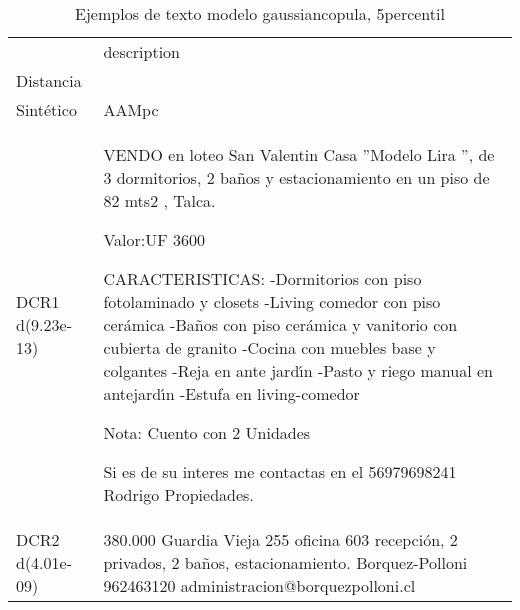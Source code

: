 \begin{table}[H]
\centering
\fontsize{10}{14}\selectfont
\caption{Ejemplos de texto modelo gaussiancopula, 5percentil}
\label{table-example-economicos-b-2-gaussiancopula-5p-text}
\begin{tabular}{|l|m{35em}|}
\hline
\rowcolor[gray]{0.8}
 & description \\
Distancia &  \\
\hline Sintético & AAMpc \\
\hline DCR1 d(9.23e-13) & VENDO en loteo San Valentin Casa ''Modelo Lira '', de 3 dormitorios, 2 ba\~nos y estacionamiento en un piso de 82 mts2 , Talca.

Valor:UF 3600

CARACTERISTICAS:
-Dormitorios con piso fotolaminado y closets
-Living comedor con piso cer\'amica
-Ba\~nos con piso cer\'amica y vanitorio con cubierta de granito
-Cocina con muebles base y colgantes
-Reja en ante jard{\'\i}n
-Pasto y riego manual en antejard{\'\i}n
-Estufa en living-comedor
 

Nota: Cuento con 2 Unidades

Si es de su interes me contactas en el 56979698241 Rodrigo Propiedades. \\
\hline DCR2 d(4.01e-09) & 380.000 Guardia Vieja 255 oficina 603 recepci\'on, 2 privados, 2 ba\~nos, estacionamiento. Borquez-Polloni 962463120 administracion@borquezpolloni.cl \\
\hline
\end{tabular}
\end{table}
